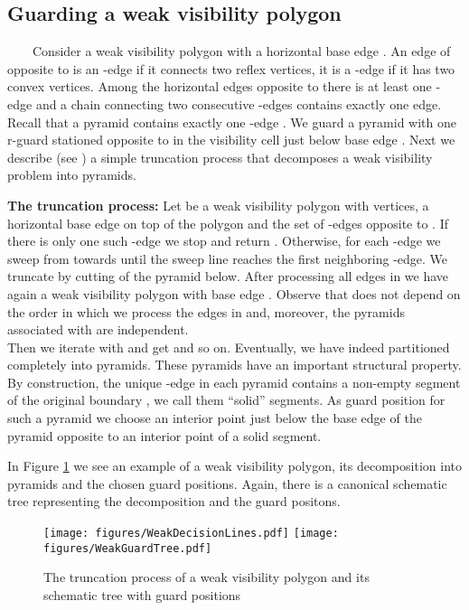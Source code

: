 \documentclass[a4paper,USenglish,numberwithinsect]{lipics}
\theoremstyle{plain}
\begin{document}
\subsection{Guarding  a weak visibility polygon}

\ \ \ \ Consider  a weak visibility polygon  with a horizontal base edge .
An edge of  opposite to  is an -edge if it connects two reflex vertices, it is a
-edge if it has two convex vertices. Among the horizontal edges opposite
to  there is at least one -edge and  a chain connecting two consecutive 
-edges contains exactly one  edge. Recall that a pyramid 
contains exactly one -edge . We guard a pyramid with one r-guard
stationed opposite to  
 in the visibility cell just below base edge . Next we describe (see
\cite{BS}) a simple truncation process that decomposes a weak
visibility problem into pyramids.

{\bf The truncation process:}
Let  be a weak visibility polygon with  vertices, a  horizontal  base
edge  on top of the polygon and  the set of -edges opposite to . If there is only
one such -edge we stop and return . Otherwise, for each -edge  we
sweep  from  
towards  until the sweep line reaches the first neighboring  -edge.  
We truncate  by cutting of the pyramid below. After processing all
edges in  we have again a weak visibility polygon  with base
edge . Observe that  does not depend on the order in which
we process the edges in 
 and, moreover, the pyramids associated with  are independent.\\
Then we iterate with  and get  and so on. Eventually, we have indeed
partitioned  completely into pyramids. These pyramids have an
important structural property. By construction, the unique -edge in
each pyramid contains a non-empty segment of the original boundary
, we call them ``solid'' segments. As guard position for
such a pyramid we choose an interior point  just below the base edge of
the pyramid opposite to an interior point of a solid segment.  
 
In Figure \ref{covGuards} we see an example of a weak visibility
polygon, its decomposition into pyramids and the chosen guard positions.
Again, there is a canonical schematic tree representing the
decomposition and the guard positons.



\begin{figure}
\centering
\texttt{[image: figures/WeakDecisionLines.pdf]}\quad\quad
\texttt{[image: figures/WeakGuardTree.pdf]}
\caption{The truncation  process of a  weak visibility polygon and its
schematic tree with guard positions}
\label{covGuards}
\end{figure}
\end{document}
